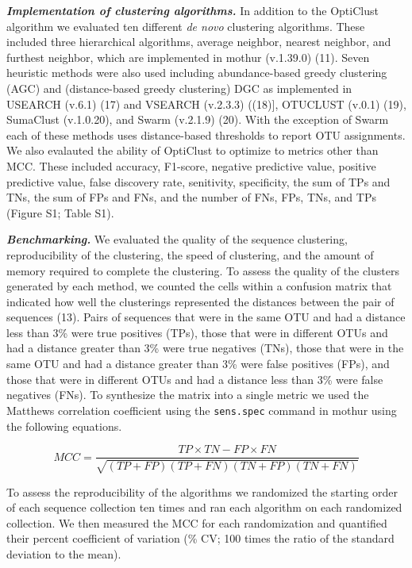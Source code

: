 \documentclass[11pt,]{article}
\begin{document}
\textbf{\emph{Implementation of clustering algorithms.}} In addition to
the OptiClust algorithm we evaluated ten different \emph{de novo}
clustering algorithms. These included three hierarchical algorithms,
average neighbor, nearest neighbor, and furthest neighbor, which are
implemented in mothur (v.1.39.0) (11). Seven heuristic methods were also
used including abundance-based greedy clustering (AGC) and
(distance-based greedy clustering) DGC as implemented in USEARCH (v.6.1)
(17) and VSEARCH (v.2.3.3) ((18){]}, OTUCLUST (v.0.1) (19), SumaClust
(v.1.0.20), and Swarm (v.2.1.9) (20). With the exception of Swarm each
of these methods uses distance-based thresholds to report OTU
assignments. We also evalauted the ability of OptiClust to optimize to
metrics other than MCC. These included accuracy, F1-score, negative
predictive value, positive predictive value, false discovery rate,
senitivity, specificity, the sum of TPs and TNs, the sum of FPs and FNs,
and the number of FNs, FPs, TNs, and TPs (Figure S1; Table S1).

\textbf{\emph{Benchmarking.}} We evaluated the quality of the sequence
clustering, reproducibility of the clustering, the speed of clustering,
and the amount of memory required to complete the clustering. To assess
the quality of the clusters generated by each method, we counted the
cells within a confusion matrix that indicated how well the clusterings
represented the distances between the pair of sequences (13). Pairs of
sequences that were in the same OTU and had a distance less than 3\%
were true positives (TPs), those that were in different OTUs and had a
distance greater than 3\% were true negatives (TNs), those that were in
the same OTU and had a distance greater than 3\% were false positives
(FPs), and those that were in different OTUs and had a distance less
than 3\% were false negatives (FNs). To synthesize the matrix into a
single metric we used the Matthews correlation coefficient using the
\texttt{sens.spec} command in mothur using the following equations.

\[
MCC = \frac{TP \times TN-FP \times FN}{\sqrt{(TP+FP)(TP+FN)(TN+FP)(TN+FN)} }
\]

To assess the reproducibility of the algorithms we randomized the
starting order of each sequence collection ten times and ran each
algorithm on each randomized collection. We then measured the MCC for
each randomization and quantified their percent coefficient of variation
(\% CV; 100 times the ratio of the standard deviation to the mean).
\end{document}
